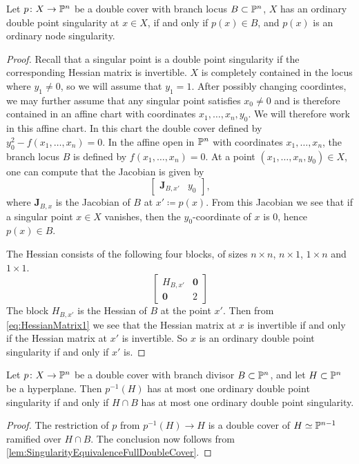 \begin{lemma}
  \label{lem:SingularityEquivalenceFullDoubleCover}
  Let $p \from X \to \P^n$ be a double cover with branch locus $B \subset \P^n$, $X$ has an ordinary double point singularity at $x \in X$, if and only if $p(x) \in B$, and $p(x)$ is an ordinary node singularity.
\end{lemma}
\begin{proof}
Recall that a singular point is a double point singularity if the corresponding Hessian matrix is invertible. $X$ is completely contained in the locus where $y_1 \neq 0$, so we will assume that $y_1 = 1$. After possibly changing coordintes, we may further assume that any singular point satisfies $x_0 \neq 0$ and is therefore contained in an affine chart with coordinates $x_1,\dots,x_n,y_0$. We will therefore work in this affine chart.
In this chart the double cover defined by $y_0^2 - f(x_1,\dots,x_n) = 0$. In the affine open in $\P^n$ with coordinates $x_1,\dots,x_n$, the branch locus $B$ is defined by $f(x_1,\dots,x_n)=0$. At a point $(x_1,\dots,x_n,y_0) \in X$, one can compute that the Jacobian is given by
\[
  \begin{bmatrix}
    \mathbf{J}_{B,x'} & y_0
  \end{bmatrix},
\]
where $\mathbf{J}_{B,x}$ is the Jacobian of $B$ at $x' \coloneqq p(x)$. From this Jacobian we see that if a singular point $x \in X$ vanishes, then the $y_0$-coordinate of $x$ is $0$, hence $p(x) \in B$.

 The Hessian consists of the following four blocks, of sizes $n \times n$, $n\times 1$, $1 \times n$ and $1 \times 1$.
 \begin{equation}
   \label{eq:HessianMatrix1}
     \begin{bmatrix}
    H_{B,x'} & \mathbf{0} \\
    \mathbf{0} & 2
  \end{bmatrix}
 \end{equation}
The block $H_{B,x'}$ is the Hessian of $B$ at the point $x'$. Then from \eqref{eq:HessianMatrix1} we see that the Hessian matrix at $x$ is invertible if and only if the Hessian matrix at $x'$ is invertible. So $x$ is an ordinary double point singularity if and only if $x'$ is.
\end{proof}

\begin{corollary}
	\label{lem:SingularityEquivalence}
	Let $p \from X \to \P^n$ be a double cover with branch divisor $B \subset \P^n$, and let $H \subset \P^n$ be a hyperplane. Then $p^{-1}(H)$ has at most one ordinary double point singularity if and only if $H \cap B$ has at most one ordinary double point singularity.
\end{corollary}
\begin{proof}
	The restriction of $p$ from $p^{-1}(H) \to H$ is a double cover of $H \simeq \P^{n-1}$ ramified over $H \cap B$. The conclusion now follows from \cref{lem:SingularityEquivalenceFullDoubleCover}.
\end{proof}

